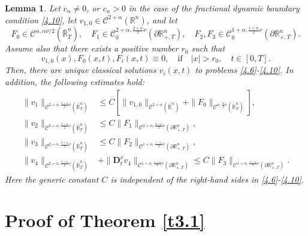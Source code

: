 \documentclass[reqno]{amsart}
\def\R {\mathbb{R}}
\def\C {\mathcal{C}}
\newtheorem{lemma}[proposition]{Lemma}
\theoremstyle{definition}
\numberwithin{equation}{section}
\begin{document}
\begin{lemma}\label{l4.2}
Let $c_n\neq 0$, or $c_n>0$ in the case of the fractional dynamic boundary condition \eqref{4.10}, let $v_{1,0}\in\C^{2+\alpha}(\R^{n})$, and let
\[
F_0\in\C^{\alpha,\alpha\nu/2}(\bar{\R}_{T}^{n}),\quad F_1\in\C_{0}^{2+\alpha,\frac{2+\alpha}{2}\nu}(\partial\R_{+,T}^{n}),\quad
F_2,F_3\in\C_{0}^{1+\alpha,\frac{1+\alpha}{2}\nu}(\partial\R_{+,T}^{n}).
\]
Assume also that there exists a positive number $r_0$ such that
\[
v_{1,0}(x),F_{0}(x,t),F_{i}(x,t)\equiv 0,\quad\text{if}\quad |x|>r_0, \quad t\in[0,T].
\]
Then, there are unique classical solutions $v_i(x,t)$ to problems \eqref{4.6}-\eqref{4.10}. In addition, the following estimates hold:
\begin{align*}
\|v_{1}\|_{\C^{2+\alpha,\frac{2+\alpha}{2}\nu}(\bar{\R}_{T}^{n})}&\leq C[\|v_{1,0}\|_{\C^{2+\alpha}(\bar{\R}^{n})}+
\|F_{0}\|_{\C^{\alpha,\frac{\alpha}{2}\nu}(\bar{\R}_{T}^{n})}],\\
\|v_{2}\|_{\C^{2+\alpha,\frac{2+\alpha}{2}\nu}(\bar{\R}_{T}^{n})}&\leq C
\|F_{1}\|_{\C^{2+\alpha,\frac{2+\alpha}{2}\nu}(\partial\R_{+,T}^{n})},\\
\|v_{3}\|_{\C^{2+\alpha,\frac{2+\alpha}{2}\nu}(\bar{\R}_{T}^{n})}&\leq C
\|F_{2}\|_{\C^{1+\alpha,\frac{1+\alpha}{2}\nu}(\partial\R_{+,T}^{n})},\\
\|v_{4}\|_{\C^{2+\alpha,\frac{2+\alpha}{2}\nu}(\bar{\R}_{T}^{n})}
&+\|\mathbf{D}_{t}^{\nu}v_4\|_{\C^{1+\alpha,\frac{1+\alpha}{2}\nu}(\partial\R_{+,T}^{n})}
\leq C
\|F_{3}\|_{\C^{1+\alpha,\frac{1+\alpha}{2}\nu}(\partial\R_{+,T}^{n})}.
\end{align*}
Here the generic constant $C$ is independent of the right-hand sides in \eqref{4.6}-\eqref{4.10}.
\end{lemma}




\section{Proof of Theorem \ref{t3.1}}
\label{s5}
\end{document}
